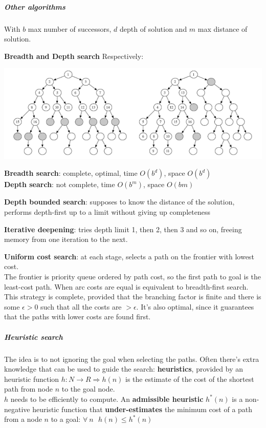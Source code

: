 \documentclass[10pt]{report}
\begin{document}
\subparagraph{Other algorithms} With $b$ max number of successors, $d$ depth of solution and $m$ max distance of solution. \begin{list}{}{}
	\item \textbf{Breadth and Depth search} Respectively:
		\begin{center}
			\includegraphics[scale=0.75]{4.png}
		\end{center}
		\textbf{Breadth search}: complete, optimal, time $O(b^d)$, space $O(b^d)$\\
		\textbf{Depth search}: not complete, time $O(b^m)$, space $O(bm)$
	\item \textbf{Depth bounded search}: supposes to know the distance of the solution, performs depth-first up to a limit without giving up completeness
	\item \textbf{Iterative deepening}: tries depth limit 1, then 2, then 3 and so on, freeing memory from one iteration to the next.
	\item \textbf{Uniform cost search}: at each stage, selects a path on the frontier with lowest cost.\\
	The frontier is priority queue ordered by path cost, so the first path to goal is the least-cost path. When arc costs are equal is equivalent to breadth-first search.\\
	This strategy is complete, provided that the branching factor is finite and there is some $\epsilon > 0$ such that all the costs are $> \epsilon$. It's also optimal, since it guarantees that the paths with lower costs are found first.
\end{list}
\subparagraph{Heuristic search} The idea is to not ignoring the goal when selecting the paths. Often there's extra knowledge that can be used to guide the search: \textbf{heuristics}, provided by an heuristic function $h:N\rightarrow R \Rightarrow h(n)$ is the estimate of the cost of the shortest path from node $n$ to the goal node.\\
$h$ needs to be efficiently to compute. An \textbf{admissible heuristic} $h^*(n)$ is a non-negative heuristic function that \textbf{under-estimates} the minimum cost of a path from a node $n$ to a goal: $\forall\:n\:\:\:h(n) \leq h^*(n)$\\\\
\end{document}
